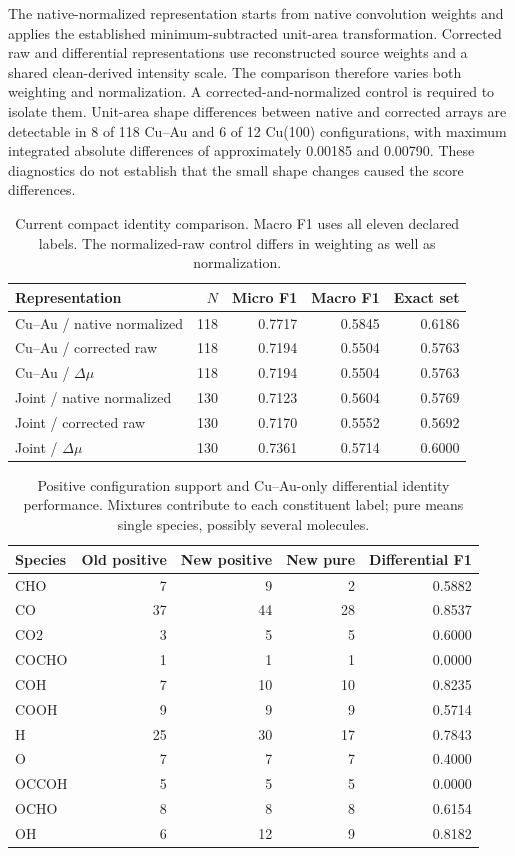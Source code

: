 The native-normalized representation starts from native convolution weights and applies the established minimum-subtracted unit-area transformation. Corrected raw and differential representations use reconstructed source weights and a shared clean-derived intensity scale. The comparison therefore varies both weighting and normalization. A corrected-and-normalized control is required to isolate them. Unit-area shape differences between native and corrected arrays are detectable in 8 of 118 Cu--Au and 6 of 12 Cu(100) configurations, with maximum integrated absolute differences of approximately 0.00185 and 0.00790. These diagnostics do not establish that the small shape changes caused the score differences.

\begin{table}[!htbp]\centering\small
\caption{Current compact identity comparison. Macro F1 uses all eleven declared labels. The normalized-raw control differs in weighting as well as normalization.}
\begin{tabular}{lrrrr}\toprule
Representation & $N$ & Micro F1 & Macro F1 & Exact set\\\midrule
Cu--Au / native normalized & 118 & 0.7717 & 0.5845 & 0.6186\\
Cu--Au / corrected raw & 118 & 0.7194 & 0.5504 & 0.5763\\
Cu--Au / $\Delta\mu$ & 118 & 0.7194 & 0.5504 & 0.5763\\
Joint / native normalized & 130 & 0.7123 & 0.5604 & 0.5769\\
Joint / corrected raw & 130 & 0.7170 & 0.5552 & 0.5692\\
Joint / $\Delta\mu$ & 130 & 0.7361 & 0.5714 & 0.6000\\
\bottomrule\end{tabular}\end{table}
\begin{table}[!htbp]\centering\small
\caption{Positive configuration support and Cu--Au-only differential identity performance. Mixtures contribute to each constituent label; pure means single species, possibly several molecules.}
\begin{tabular}{lrrrr}\toprule
Species & Old positive & New positive & New pure & Differential F1\\\midrule
CHO & 7 & 9 & 2 & 0.5882\\
CO & 37 & 44 & 28 & 0.8537\\
CO2 & 3 & 5 & 5 & 0.6000\\
COCHO & 1 & 1 & 1 & 0.0000\\
COH & 7 & 10 & 10 & 0.8235\\
COOH & 9 & 9 & 9 & 0.5714\\
H & 25 & 30 & 17 & 0.7843\\
O & 7 & 7 & 7 & 0.4000\\
OCCOH & 5 & 5 & 5 & 0.0000\\
OCHO & 8 & 8 & 8 & 0.6154\\
OH & 6 & 12 & 9 & 0.8182\\
\bottomrule\end{tabular}\end{table}


